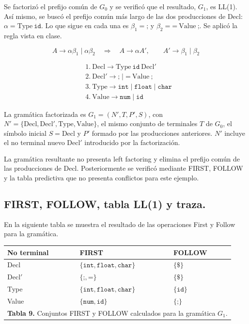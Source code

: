 \documentclass[12pt,letterpaper]{article}
\begin{document}
Se factorizó el prefijo común de $G_0$ y se verificó que el resultado, $G_1$, es LL(1). Así mismo, se buscó el prefijo común más largo de las dos producciones de Decl: $\alpha = \text{Type}\ \texttt{id}$. Lo que sigue en cada una es $\beta_1 = \texttt{;}$ y $\beta_2 = \texttt{=}\ \text{Value}\ \texttt{;}$. Se aplicó la regla vista en clase.

\[A \to \alpha\beta_1 \mid \alpha\beta_2 \quad\Longrightarrow\quad A \to \alpha A', \qquad A' \to \beta_1 \mid \beta_2\]

\begin{align*}
&1.\ \text{Decl} \rightarrow \text{Type}\ \texttt{id}\ \text{Decl}' \\
&2.\ \text{Decl}' \rightarrow \texttt{;} \mid \texttt{=}\ \text{Value}\ \texttt{;} \\
&3.\ \text{Type} \rightarrow \texttt{int} \mid \texttt{float} \mid \texttt{char} \\
&4.\ \text{Value} \rightarrow \texttt{num} \mid \texttt{id}
\end{align*}

La gramática factorizada es $G_1 = (N', T, P', S)$, con $N' = \{\text{Decl}, \text{Decl}', \text{Type}, \text{Value}\}$, el mismo conjunto de terminales $T$ de $G_0$, el símbolo inicial $S = \text{Decl}$ y $P'$ formado por las producciones anteriores. $N'$ incluye el no terminal nuevo $\text{Decl}'$ introducido por la factorización.

La gramática resultante no presenta left factoring y elimina el prefijo común de las producciones de Decl. Posteriormente se verificó mediante FIRST, FOLLOW y la tabla predictiva que no presenta conflictos para este ejemplo.

\subsection{FIRST, FOLLOW, tabla LL(1) y traza.}

En la siguiente tabla se muestra el resultado de las operaciones First y Follow para la gramática.

\begin{center}
\small
\begin{tabular}{@{}l l l@{}}
\toprule
\textbf{No terminal} & \textbf{FIRST} & \textbf{FOLLOW} \\
\midrule
Decl & $\{\texttt{int}, \texttt{float}, \texttt{char}\}$ & $\{\$\}$ \\
Decl$'$ & $\{\texttt{;}, \texttt{=}\}$ & $\{\$\}$ \\
Type & $\{\texttt{int}, \texttt{float}, \texttt{char}\}$ & $\{\texttt{id}\}$ \\
Value & $\{\texttt{num}, \texttt{id}\}$ & $\{\texttt{;}\}$ \\
\bottomrule
\multicolumn{3}{c}{\vspace{2pt}\footnotesize \textbf{Tabla 9.} Conjuntos FIRST y FOLLOW calculados para la gramática $G_1$.} \\
\end{tabular}
\end{center}
\end{document}
